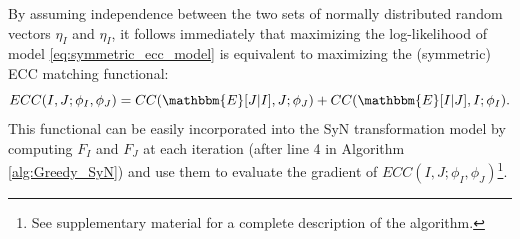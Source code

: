 By assuming independence between the two sets of normally distributed random vectors $\eta_{I}$ and $\eta_{I}$, it follows immediately that maximizing the log-likelihood of model \eqref{eq:symmetric_ecc_model} is equivalent to maximizing the (symmetric) ECC matching functional:
\begin{equation*}
    ECC(I, J;\phi_{I}, \phi_{J}) = CC(\mathbbm{E}[J|I], J ; \phi_{J}) + CC(\mathbbm{E}[I|J], I ; \phi_{I}).
\end{equation*}
This functional can be easily incorporated into the SyN transformation model by computing $F_{I}$ and $F_{J}$ at each iteration (after line 4 in Algorithm \ref{alg:Greedy_SyN}) and use them to evaluate the gradient of $ECC(I, J;\phi_{I}, \phi_{J})$\footnote{See supplementary material for a complete description of the algorithm.}.



